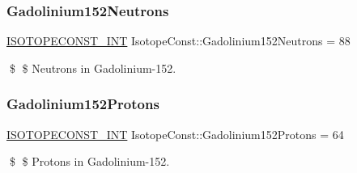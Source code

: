 \subsubsection{\texorpdfstring{Gadolinium152\+Neutrons}{Gadolinium152Neutrons}}
{\footnotesize\ttfamily \mbox{\hyperlink{group___isotope_const-_macros_ga5f18360b3e99483a35c32d789e62621c}{I\+S\+O\+T\+O\+P\+E\+C\+O\+N\+S\+T\+\_\+\+I\+NT}} Isotope\+Const\+::\+Gadolinium152\+Neutrons = 88}

\$ \$ Neutrons in Gadolinium-\/152. \mbox{\label{group___isotope_const-_gadolinium-_gd152_ga32cb3648c47a1b4aa50b6609baa4bbb3}} 
\subsubsection{\texorpdfstring{Gadolinium152\+Protons}{Gadolinium152Protons}}
{\footnotesize\ttfamily \mbox{\hyperlink{group___isotope_const-_macros_ga5f18360b3e99483a35c32d789e62621c}{I\+S\+O\+T\+O\+P\+E\+C\+O\+N\+S\+T\+\_\+\+I\+NT}} Isotope\+Const\+::\+Gadolinium152\+Protons = 64}

\$ \$ Protons in Gadolinium-\/152. 